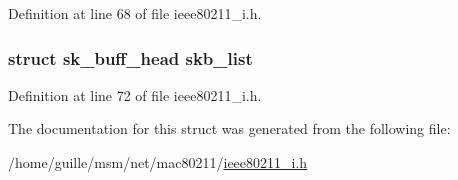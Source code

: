 Definition at line 68 of file ieee80211\-\_\-i.\-h.

\hypertarget{structieee80211__fragment__entry_ae572ad476d84353186dc8a596d035a92}{
\subsubsection[{skb\-\_\-list}]{\setlength{\rightskip}{0pt plus 5cm}struct sk\-\_\-buff\-\_\-head skb\-\_\-list}}\label{structieee80211__fragment__entry_ae572ad476d84353186dc8a596d035a92}


Definition at line 72 of file ieee80211\-\_\-i.\-h.



The documentation for this struct was generated from the following file\-:\begin{DoxyCompactItemize}
\item 
/home/guille/msm/net/mac80211/\hyperlink{ieee80211__i_8h}{ieee80211\-\_\-i.\-h}\end{DoxyCompactItemize}
